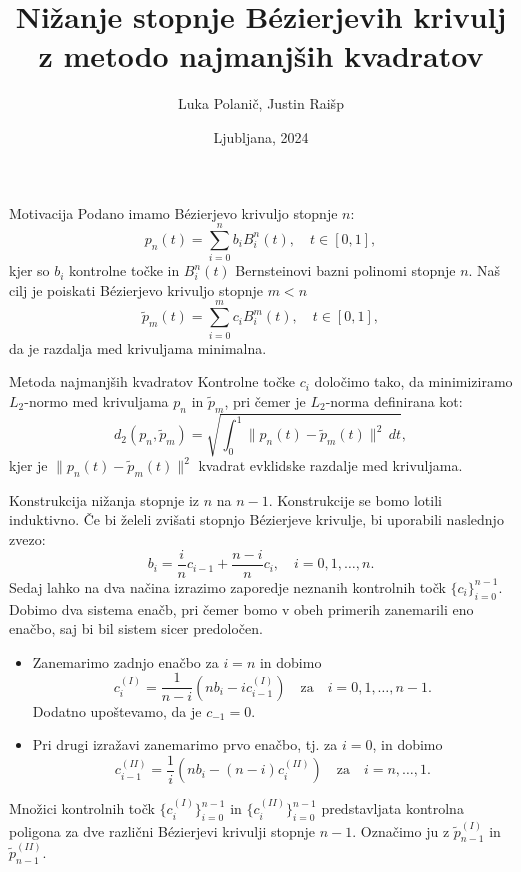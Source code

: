 \documentclass{beamer}
\title[Nižanje stopnje Bézierjevih krivulj]{Nižanje stopnje Bézierjevih krivulj z metodo najmanjših kvadratov}
\author{Luka Polanič, Justin Raišp}
\date{Ljubljana, 2024}
\begin{document}
\begin{frame}
    \titlepage
\end{frame}

\begin{frame}{Motivacija}
    Podano imamo Bézierjevo krivuljo stopnje $n$:
    \[ p_n(t) = \sum_{i=0}^n b_i B_i^n(t), \quad t \in [0, 1], \]
    kjer so $b_i$ kontrolne točke in $B_i^n(t)$ Bernsteinovi bazni polinomi stopnje $n$.
    Naš cilj je poiskati Bézierjevo krivuljo stopnje $m < n$
    \[ \tilde{p}_m(t) = \sum_{i=0}^m c_i B_i^m(t), \quad t \in [0, 1], \]
     da je razdalja med krivuljama minimalna.
\end{frame}

\begin{frame}{Metoda najmanjših kvadratov}
  Kontrolne točke $c_i$ določimo tako, da minimiziramo $L_2$-normo med krivuljama $p_n$ in $\tilde{p}_m$, pri čemer je $L_2$-norma definirana kot:
  \[ d_2(p_n, \tilde{p}_m) = \sqrt{\int_0^1 \|p_n(t) - \tilde{p}_m(t)\|^2 \, dt}, \]
  kjer je $\|p_n(t) - \tilde{p}_m(t)\|^2$ kvadrat evklidske razdalje med krivuljama.
\end{frame}

\begin{frame}{Konstrukcija nižanja stopnje iz $n$ na $n-1$.}
Konstrukcije se bomo lotili induktivno. Če bi želeli zvišati stopnjo Bézierjeve krivulje, bi uporabili naslednjo zvezo: 
\[
b_i = \frac{i}{n} c_{i-1} + \frac{n-i}{n} c_i, \quad i = 0, 1, \ldots, n.
\]
Sedaj lahko na dva načina izrazimo zaporedje neznanih kontrolnih točk $\{c_i\}_{i=0}^{n-1}$.
Dobimo dva sistema enačb, pri čemer bomo v obeh primerih zanemarili eno enačbo,
saj bi bil sistem sicer predoločen.
\end{frame}

\begin{frame}
  \begin{itemize}
    \item Zanemarimo zadnjo enačbo za $i = n$ in dobimo
    \[
    c_i^{(I)} = \frac{1}{n - i} \left( n b_i - i c_{i-1}^{(I)} \right) \quad \text{za} \quad i = 0, 1, \ldots, n - 1.
    \]
    Dodatno upoštevamo, da je $c_{-1} = 0$.
    \item Pri drugi izražavi zanemarimo prvo enačbo, tj. za $i = 0$, in dobimo
    \[
    c_{i-1}^{(II)} = \frac{1}{i} \left( n b_i - (n - i) c_i^{(II)} \right) \quad \text{za} \quad i = n, \ldots, 1.
    \]
  \end{itemize}
  Množici kontrolnih točk $\{c_i^{(I)}\}_{i=0}^{n-1}$ in $\{c_i^{(II)}\}_{i=0}^{n-1}$ predstavljata kontrolna poligona za dve različni Bézierjevi krivulji stopnje $n - 1$. Označimo ju z $\tilde{p}_{n-1}^{(I)}$ in $\tilde{p}_{n-1}^{(II)}$.
\end{frame}
\end{document}
